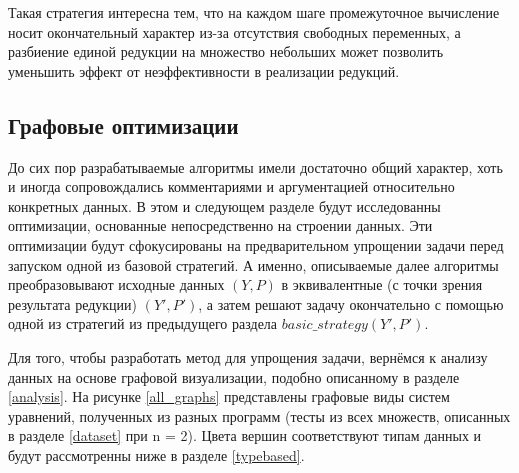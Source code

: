 \documentclass[../thesis.tex]{subfiles}
\begin{document}
Такая стратегия интересна тем, что на каждом шаге промежуточное вычисление носит окончательный характер из-за отсутствия свободных переменных, а разбиение единой редукции на множество небольших может позволить уменьшить эффект от неэффективности в реализации редукций.

\subsection{Графовые оптимизации}\label{graphbased}

До сих пор разрабатываемые алгоритмы имели достаточно общий характер, хоть и иногда сопровождались комментариями и аргументацией относительно конкретных данных. В этом и следующем разделе будут исследованны оптимизации, основанные непосредственно на строении данных. Эти оптимизации будут сфокусированы на предварительном упрощении задачи перед запуском одной из базовой стратегий. А именно, описываемые далее алгоритмы преобразовывают исходные данных $(Y, P)$ в эквивалентные (с точки зрения результата редукции) $(Y', P')$, а затем решают задачу окончательно с помощью одной из стратегий из предыдущего раздела $basic\_strategy(Y', P')$.

Для того, чтобы разработать метод для упрощения задачи, вернёмся к анализу данных на основе графовой визуализации, подобно описанному в разделе \ref{analysis}. На рисунке \ref{all_graphs} представлены графовые виды систем уравнений, полученных из разных программ (тесты из всех множеств, описанных в разделе \ref{dataset} при n = 2). Цвета вершин соответствуют типам данных и будут рассмотренны ниже в разделе \ref{typebased}.

\captionsetup{justification   = raggedright,
              singlelinecheck = false}
\end{document}
